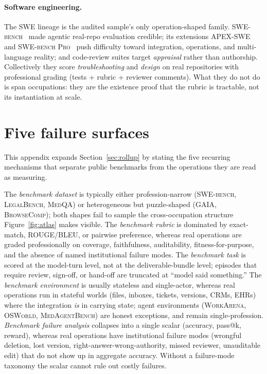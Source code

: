 \documentclass{article}
\begin{document}
\paragraph{Software engineering.} The SWE lineage is the audited sample's only operation-shaped family.
\textsc{SWE-bench}~\citep{jimenez2024swebench} made agentic real-repo evaluation credible; its extensions \textsc{APEX-SWE}~\citep{kottamasu2026apex} and \textsc{SWE-bench Pro}~\citep{swebenchpro2025} push difficulty toward integration, operations, and multi-language reality; and code-review suites \citep{sweprbench2025,codefusecrbench2025,withmartiancr2024} target \emph{appraisal} rather than authorship.
Collectively they score \emph{troubleshooting} and \emph{design} on real repositories with professional grading (tests + rubric + reviewer comments).
What they do not do is span occupations: they are the existence proof that the rubric is tractable, not its instantiation at scale.

\section{Five failure surfaces}
\label{app:surfaces}

This appendix expands Section~\ref{sec:rollup} by stating the five recurring mechanisms that separate public benchmarks from the operations they are read as measuring.

The \emph{benchmark dataset} is typically either profession-narrow (\textsc{SWE-bench}, \textsc{LegalBench}, \textsc{MedQA}) or heterogeneous but puzzle-shaped (\textsc{GAIA}, \textsc{BrowseComp}); both shapes fail to sample the cross-occupation structure Figure~\ref{fig:atlas} makes visible.
The \emph{benchmark rubric} is dominated by exact-match, ROUGE/BLEU, or pairwise preference, whereas real operations are graded professionally on coverage, faithfulness, auditability, fitness-for-purpose, and the absence of named institutional failure modes.
The \emph{benchmark task} is scored at the model-turn level, not at the deliverable-bundle level; episodes that require review, sign-off, or hand-off are truncated at ``model said something.''
The \emph{benchmark environment} is usually stateless and single-actor, whereas real operations run in stateful worlds (files, inboxes, tickets, versions, CRMs, EHRs) where the integration \emph{is} in carrying state; agent environments (\textsc{WorkArena}, \textsc{OSWorld}, \textsc{MedAgentBench}) are honest exceptions, and remain single-profession.
\emph{Benchmark failure analysis} collapses into a single scalar (accuracy, pass@k, reward), whereas real operations have institutional failure modes (wrongful deletion, lost version, right-answer-wrong-authority, missed reviewer, unauditable edit) that do not show up in aggregate accuracy.
Without a failure-mode taxonomy the scalar cannot rule out costly failures.
\end{document}
